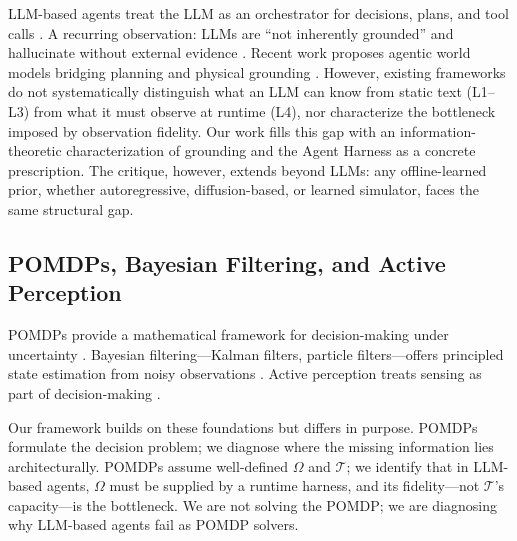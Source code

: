 LLM-based agents treat the LLM as an orchestrator for decisions, plans, and tool calls \citep{kang2026lifecycle,xie2025empowering}. A recurring observation: LLMs are ``not inherently grounded'' and hallucinate without external evidence \citep{kang2026lifecycle}. Recent work proposes agentic world models bridging planning and physical grounding \citep{zhang2024agentic,ren2026aligning}. However, existing frameworks do not systematically distinguish what an LLM can know from static text (L1--L3) from what it must observe at runtime (L4), nor characterize the bottleneck imposed by observation fidelity. Our work fills this gap with an information-theoretic characterization of grounding and the Agent Harness as a concrete prescription. The critique, however, extends beyond LLMs: any offline-learned prior, whether autoregressive, diffusion-based, or learned simulator, faces the same structural gap.

\subsection{POMDPs, Bayesian Filtering, and Active Perception}

POMDPs provide a mathematical framework for decision-making under uncertainty \citep{kaelbling1998planning,thrun2005probabilistic}. Bayesian filtering---Kalman filters, particle filters---offers principled state estimation from noisy observations \citep{doucet2001sequential}. Active perception treats sensing as part of decision-making \citep{bajcsy1988active,aloimonos1988active}.

Our framework builds on these foundations but differs in purpose. POMDPs formulate the decision problem; we diagnose where the missing information lies architecturally. POMDPs assume well-defined \(\Omega\) and \(\mathcal{T}\); we identify that in LLM-based agents, \(\Omega\) must be supplied by a runtime harness, and its fidelity---not \(\mathcal{T}\)'s capacity---is the bottleneck. We are not solving the POMDP; we are diagnosing why LLM-based agents fail as POMDP solvers.

